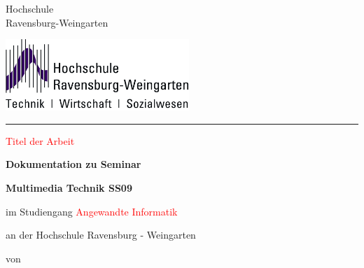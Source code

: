 
\thispagestyle{empty}
{
\normalsize{} \fontsize{12pt}{10}\selectfont 
\vspace{-1cm}
\begin{minipage}[b]{9.4cm}
{\fontsize{13pt}{13} \selectfont%
Hochschule\\[1ex]
Ravensburg-Weingarten}\\[1ex]
\end{minipage}
}
\begin{minipage}[b]{10cm}
\includegraphics*[height=2.7cm]{bilder/HSLogoWGd}
\end{minipage}


\vspace{10mm}
 
\hrule 
\vspace{1cm}
{
 \fontsize{20pt}{20}  \selectfont%
\begin{center}
\textcolor{red}{Titel der Arbeit} %
\end{center}
}

\begin{center}
\large \textbf{Dokumentation zu Seminar} %
\end{center}

\begin{center}
\textbf{Multimedia Technik SS09} %
\end{center}

\vspace{5mm}

\begin{center}
im Studiengang \textcolor{red}{Angewandte Informatik} %
\end{center}

\begin{center}
an der Hochschule Ravensburg - Weingarten 
\end{center}
\begin{center}

\end{center}
\vspace{5mm}
\begin{center}
von
\end{center}




